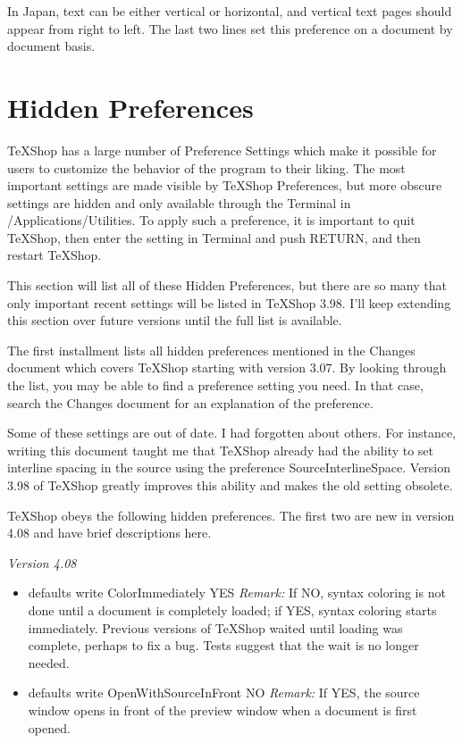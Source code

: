 \documentclass[11pt, oneside]{article}   	%
\begin{document}
 In Japan, text can be either vertical or horizontal, and vertical text pages should appear from right to left.  The last two lines set this preference on a document by document basis.


 
\section{Hidden Preferences}
TeXShop has a large number of Preference Settings which make it possible for users to customize the behavior of the program to their liking. The most important settings are made visible by TeXShop Preferences, but more obscure settings are hidden and only available through the Terminal in /Applications/Utilities. To apply such a preference, it is important to quit TeXShop, then enter the setting in Terminal and push RETURN, and then restart TeXShop. 

This section will list all of these Hidden Preferences, but there are so many that only important recent settings will be listed in TeXShop 3.98. I'll keep extending this section over future versions until the full list is available. 

The first installment lists all hidden preferences mentioned in the Changes document which covers TeXShop starting with version 3.07. By looking through the list, you may be able to find a preference setting you need. In that case, search the Changes document for an explanation of the preference. 

Some of these settings are out of date. I had forgotten about others. For instance, writing this document taught me that TeXShop already had the ability to set interline spacing in the source using the preference SourceInterlineSpace. Version 3.98 of TeXShop greatly improves this ability and makes the old setting obsolete.


TeXShop obeys the following hidden preferences. The first two are new in version 4.08 and have brief descriptions here.

{\em Version 4.08}
\begin{itemize}
\item defaults write ColorImmediately YES \newline \newline
{\em Remark:} If NO, syntax coloring is not done until a document is completely loaded; if YES, syntax coloring starts immediately. Previous versions of TeXShop waited until loading was complete, perhaps to fix a bug. Tests suggest that the wait is no longer needed. \newline
\item defaults write OpenWithSourceInFront NO \newline \newline
{\em Remark:}  If YES, the source window opens in front of the preview window when a document is first opened. \newline
\end{itemize}
\end{document}
